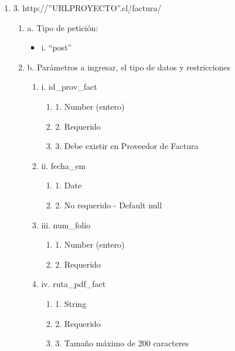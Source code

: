 \begin{enumerate}
    \item 3. http://”URLPROYECTO”.cl/factura/
    \begin{enumerate}
        \item a. Tipo de petición:
            \begin{itemize}
               \item i. “post”
            \end{itemize}
        \item b. Parámetros a ingresar, el tipo de datos y restricciones
            \begin{enumerate}
                \item i. id\_prov\_fact
                    \begin{enumerate}
                        \item 1. Number (entero)
                        \item 2. Requerido
                        \item 3. Debe existir en Proveedor de Factura
                    \end{enumerate}
                \item ii. fecha\_em
                    \begin{enumerate}
                        \item 1. Date
                        \item 2. No requerido - Default null
                    \end{enumerate}
                \item iii. num\_folio
                    \begin{enumerate}
                        \item 1. Number (entero)
                        \item 2. Requerido
                    \end{enumerate}
                \item iv. ruta\_pdf\_fact
                    \begin{enumerate}
                        \item 1. String
                        \item 2. Requerido
                        \item 3. Tamaño máximo de 200 caracteres
                    \end{enumerate}
            \end{enumerate}
    \end{enumerate}


\end{enumerate}
